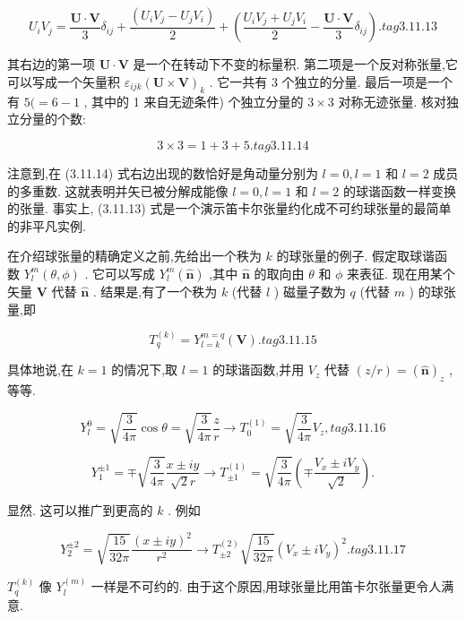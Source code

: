 $$
{U}_{i}{V}_{j} = \frac{\mathbf{U} \cdot \mathbf{V}}{3}{\delta }_{ij} + \frac{\left( {U}_{i}{V}_{j} - {U}_{j}{V}_{i}\right) }{2} + \left( {\frac{{U}_{i}{V}_{j} + {U}_{j}{V}_{i}}{2} - \frac{\mathbf{U} \cdot \mathbf{V}}{3}{\delta }_{ij}}\right) . tag{3.11.13}
$$

其右边的第一项 $\mathbf{U} \cdot \mathbf{V}$ 是一个在转动下不变的标量积. 第二项是一个反对称张量,它可以写成一个矢量积 ${\varepsilon }_{ijk}{\left( \mathbf{U} \times \mathbf{V}\right) }_{k}$ . 它一共有 3 个独立的分量. 最后一项是一个有 $5( = 6 - 1$ , 其中的 1 来自无迹条件) 个独立分量的 $3 \times 3$ 对称无迹张量. 核对独立分量的个数:

$$
3 \times 3 = 1 + 3 + 5. tag{3.11.14}
$$

注意到,在 (3.11.14) 式右边出现的数恰好是角动量分别为 $l = 0, l = 1$ 和 $l = 2$ 成员的多重数. 这就表明并矢已被分解成能像 $l = 0, l = 1$ 和 $l = 2$ 的球谐函数一样变换的张量. 事实上, (3.11.13) 式是一个演示笛卡尔张量约化成不可约球张量的最简单的非平凡实例.

在介绍球张量的精确定义之前,先给出一个秩为 $k$ 的球张量的例子. 假定取球谐函数 ${Y}_{l}^{m}\left( {\theta ,\phi }\right)$ . 它可以写成 ${Y}_{l}^{m}\left( \widehat{\mathbf{n}}\right)$ ,其中 $\widehat{\mathbf{n}}$ 的取向由 $\theta$ 和 $\phi$ 来表征. 现在用某个矢量 $\mathbf{V}$ 代替 $\widehat{\mathbf{n}}$ . 结果是,有了一个秩为 $k$ (代替 $l$ ) 磁量子数为 $q$ (代替 $m$ ) 的球张量,即

$$
{T}_{q}^{\left( k\right) } = {Y}_{l = k}^{m = q}\left( \mathbf{V}\right) . tag{3.11.15}
$$

具体地说,在 $k = 1$ 的情况下,取 $l = 1$ 的球谐函数,并用 ${V}_{z}$ 代替 $\left( {z/r}\right) = {\left( \widehat{\mathbf{n}}\right) }_{z}$ ,等等.

$$
{Y}_{l}^{0} = \sqrt{\frac{3}{4\pi }}\cos \theta = \sqrt{\frac{3}{4\pi }}\frac{z}{r} \rightarrow {T}_{0}^{\left( 1\right) } = \sqrt{\frac{3}{4\pi }}{V}_{z}, tag{3.11.16}
$$

$$
{Y}_{1}^{\pm 1} = \mp \sqrt{\frac{3}{4\pi }}\frac{x \pm {iy}}{\sqrt{2}r} \rightarrow {T}_{\pm 1}^{\left( 1\right) } = \sqrt{\frac{3}{4\pi }}\left( {\mp \frac{{V}_{x} \pm i{V}_{y}}{\sqrt{2}}}\right) .
$$

显然. 这可以推广到更高的 $k$ . 例如

$$
{Y}_{2}^{\pm 2} = \sqrt{\frac{15}{32\pi }}\frac{{\left( x \pm iy\right) }^{2}}{{r}^{2}} \rightarrow {T}_{\pm 2}^{\left( 2\right) }\sqrt{\frac{15}{32\pi }}{\left( {V}_{x} \pm i{V}_{y}\right) }^{2}. tag{3.11.17}
$$

${T}_{q}^{\left( k\right) }$ 像 ${Y}_{l}^{\left( m\right) }$ 一样是不可约的. 由于这个原因,用球张量比用笛卡尔张量更令人满意.

